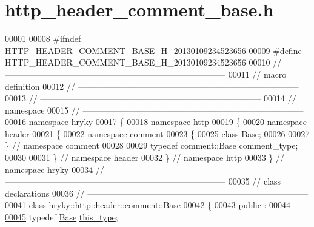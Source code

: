 \hypertarget{http__header__comment__base_8h_source}{\section{http\-\_\-header\-\_\-comment\-\_\-base.\-h}
}

\begin{DoxyCode}
00001 
00008 \textcolor{preprocessor}{#ifndef HTTP\_HEADER\_COMMENT\_BASE\_H\_20130109234523656}
00009 \textcolor{preprocessor}{}\textcolor{preprocessor}{#define HTTP\_HEADER\_COMMENT\_BASE\_H\_20130109234523656}
00010 \textcolor{preprocessor}{}\textcolor{comment}{//
      ------------------------------------------------------------------------------}
00011 \textcolor{comment}{// macro definition}
00012 \textcolor{comment}{//
      ------------------------------------------------------------------------------}
00013 \textcolor{comment}{//
      ------------------------------------------------------------------------------}
00014 \textcolor{comment}{// namespace}
00015 \textcolor{comment}{//
      ------------------------------------------------------------------------------}
00016 \textcolor{keyword}{namespace }hryky
00017 \{
00018 \textcolor{keyword}{namespace }http
00019 \{
00020 \textcolor{keyword}{namespace }header
00021 \{
00022 \textcolor{keyword}{namespace }comment
00023 \{
00025     \textcolor{keyword}{class }Base;
00026 
00027 \} \textcolor{comment}{// namespace comment}
00028 
00029 \textcolor{keyword}{typedef} comment::Base comment\_type;
00030 
00031 \} \textcolor{comment}{// namespace header}
00032 \} \textcolor{comment}{// namespace http}
00033 \} \textcolor{comment}{// namespace hryky}
00034 \textcolor{comment}{//
      ------------------------------------------------------------------------------}
00035 \textcolor{comment}{// class declarations}
00036 \textcolor{comment}{//
      ------------------------------------------------------------------------------}
\hypertarget{http__header__comment__base_8h_source_l00041}{}\hyperlink{classhryky_1_1http_1_1header_1_1comment_1_1_base}{00041} \textcolor{comment}{}\textcolor{keyword}{class }\hyperlink{classhryky_1_1http_1_1header_1_1comment_1_1_base}{hryky::http::header::comment::Base}
00042 \{
00043 \textcolor{keyword}{public} :
00044 
\hypertarget{http__header__comment__base_8h_source_l00045}{}\hyperlink{classhryky_1_1http_1_1header_1_1comment_1_1_base_aaf640b42927f7c8c53ee91e0e13422ca}{00045}     \textcolor{keyword}{typedef} \hyperlink{classhryky_1_1http_1_1header_1_1comment_1_1_base}{Base} \hyperlink{classhryky_1_1http_1_1header_1_1comment_1_1_base_aaf640b42927f7c8c53ee91e0e13422ca}{this_type};

\end{DoxyCode}
